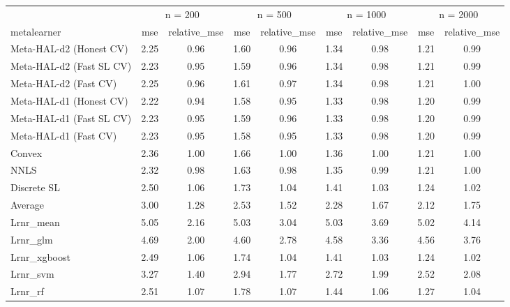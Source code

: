 
\begin{tabular}{lcccccccc}
\toprule
\multicolumn{1}{c}{ } & \multicolumn{2}{c}{n = 200} & \multicolumn{2}{c}{n = 500} & \multicolumn{2}{c}{n = 1000} & \multicolumn{2}{c}{n = 2000} \\
\cmidrule(l{3pt}r{3pt}){2-3} \cmidrule(l{3pt}r{3pt}){4-5} \cmidrule(l{3pt}r{3pt}){6-7} \cmidrule(l{3pt}r{3pt}){8-9}
metalearner & mse & relative\_mse & mse & relative\_mse & mse & relative\_mse & mse & relative\_mse\\
\midrule
Meta-HAL-d2 (Honest CV) & 2.25 & 0.96 & 1.60 & 0.96 & 1.34 & 0.98 & 1.21 & 0.99\\
Meta-HAL-d2 (Fast SL CV) & 2.23 & 0.95 & 1.59 & 0.96 & 1.34 & 0.98 & 1.21 & 0.99\\
Meta-HAL-d2 (Fast CV) & 2.25 & 0.96 & 1.61 & 0.97 & 1.34 & 0.98 & 1.21 & 1.00\\
Meta-HAL-d1 (Honest CV) & 2.22 & 0.94 & 1.58 & 0.95 & 1.33 & 0.98 & 1.20 & 0.99\\
Meta-HAL-d1 (Fast SL CV) & 2.23 & 0.95 & 1.59 & 0.96 & 1.33 & 0.98 & 1.20 & 0.99\\
Meta-HAL-d1 (Fast CV) & 2.23 & 0.95 & 1.58 & 0.95 & 1.33 & 0.98 & 1.20 & 0.99\\
Convex & 2.36 & 1.00 & 1.66 & 1.00 & 1.36 & 1.00 & 1.21 & 1.00\\
NNLS & 2.32 & 0.98 & 1.63 & 0.98 & 1.35 & 0.99 & 1.21 & 1.00\\
Discrete SL & 2.50 & 1.06 & 1.73 & 1.04 & 1.41 & 1.03 & 1.24 & 1.02\\
Average & 3.00 & 1.28 & 2.53 & 1.52 & 2.28 & 1.67 & 2.12 & 1.75\\
Lrnr\_mean & 5.05 & 2.16 & 5.03 & 3.04 & 5.03 & 3.69 & 5.02 & 4.14\\
Lrnr\_glm & 4.69 & 2.00 & 4.60 & 2.78 & 4.58 & 3.36 & 4.56 & 3.76\\
Lrnr\_xgboost & 2.49 & 1.06 & 1.74 & 1.04 & 1.41 & 1.03 & 1.24 & 1.02\\
Lrnr\_svm & 3.27 & 1.40 & 2.94 & 1.77 & 2.72 & 1.99 & 2.52 & 2.08\\
Lrnr\_rf & 2.51 & 1.07 & 1.78 & 1.07 & 1.44 & 1.06 & 1.27 & 1.04\\
\bottomrule
\end{tabular}
